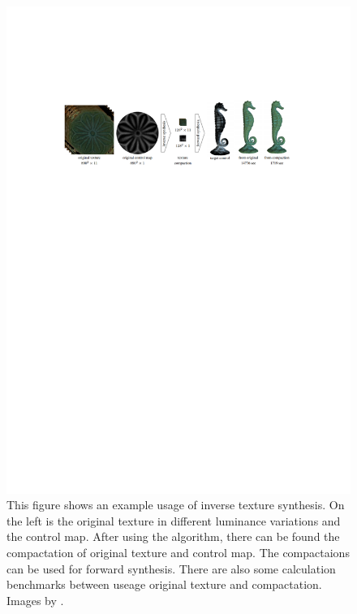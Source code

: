 \begin{figure}[h]
\centering
\includegraphics[scale=1]{img/its-example}
\caption[Inverse texture synthesis example]{This figure shows an example usage of inverse texture synthesis. On the left is the original texture in different luminance variations and the control map. After using the algorithm, there can be found the compactation of original texture and control map. The compactaions can be used for forward synthesis. There are also some calculation benchmarks between useage original texture and compactation.\\ Images by \cite{its}.}
\label{fig:Inverse texture synthesis example}
\end{figure}


